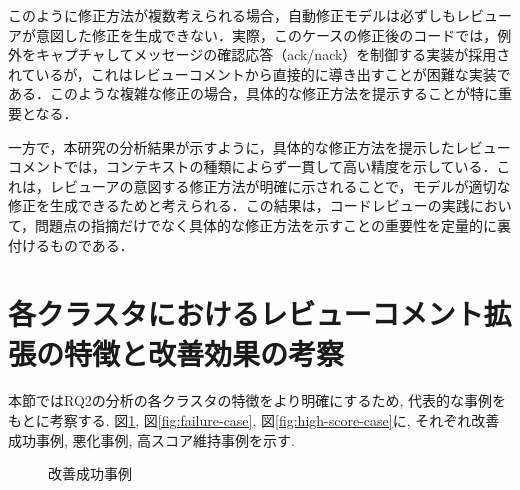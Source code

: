 \documentclass[11pt]{jreport}
\begin{document}
このように修正方法が複数考えられる場合，自動修正モデルは必ずしもレビューアが意図した修正を生成できない．実際，このケースの修正後のコードでは，例外をキャプチャしてメッセージの確認応答（ack/nack）を制御する実装が採用されているが，これはレビューコメントから直接的に導き出すことが困難な実装である．このような複雑な修正の場合，具体的な修正方法を提示することが特に重要となる．

一方で，本研究の分析結果が示すように，具体的な修正方法を提示したレビューコメントでは，コンテキストの種類によらず一貫して高い精度を示している．これは，レビューアの意図する修正方法が明確に示されることで，モデルが適切な修正を生成できるためと考えられる．この結果は，コードレビューの実践において，問題点の指摘だけでなく具体的な修正方法を示すことの重要性を定量的に裏付けるものである．

\section{各クラスタにおけるレビューコメント拡張の特徴と改善効果の考察}

本節ではRQ2の分析の各クラスタの特徴をより明確にするため, 代表的な事例をもとに考察する. 図\ref{fig:success-case}, 図\ref{fig:failure-case}, 図\ref{fig:high-score-case}に, それぞれ改善成功事例, 悪化事例, 高スコア維持事例を示す.

\begin{figure}[h]
   \centering
   \caption{改善成功事例}
   \label{fig:success-case}
\end{figure}
\end{document}
